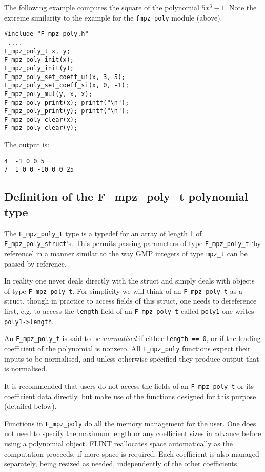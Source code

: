 \documentclass[a4paper,10pt]{article}
\newcommand{\code}{\lstinline}
\begin{document}
The following example computes the square of the polynomial $5x^3 - 1$. Note the extreme similarity to
the example for the \code{fmpz_poly} module (above).

\begin{lstlisting}
#include "F_mpz_poly.h"
 ....
F_mpz_poly_t x, y;
F_mpz_poly_init(x);
F_mpz_poly_init(y);
F_mpz_poly_set_coeff_ui(x, 3, 5);
F_mpz_poly_set_coeff_si(x, 0, -1);
F_mpz_poly_mul(y, x, x);
F_mpz_poly_print(x); printf("\n");
F_mpz_poly_print(y); printf("\n");
F_mpz_poly_clear(x);
F_mpz_poly_clear(y);
\end{lstlisting}

The output is:

\begin{lstlisting}
4  -1 0 0 5
7  1 0 0 -10 0 0 25
\end{lstlisting}

\subsection{Definition of the F\_mpz\_poly\_t polynomial type}

The \code{F_mpz_poly_t} type is a typedef for an array of length 1 of \code{F_mpz_poly_struct}'s. This 
permits passing parameters of type \code{F_mpz_poly_t} `by reference' in a manner similar to the way 
GMP integers of type \code{mpz_t} can be passed by reference. 

In reality one never deals directly with the struct and simply deals with objects of type 
\code{F_mpz_poly_t}. For simplicity we will think of an \code{F_mpz_poly_t} as a struct, though in
 practice to access fields of this struct, one needs to dereference first, e.g. to access the 
\code{length} field of an \code{F_mpz_poly_t} called \code{poly1} one writes \code{poly1->length}. 

An \code{F_mpz_poly_t} is said to be \emph{normalised} if either \code{length == 0}, or if the 
leading coefficient of the polynomial is nonzero. All \code{F_mpz_poly} functions expect their inputs 
to be normalised, and unless otherwise specified they produce output that is normalised. 

It is recommended that users do not access the fields of an \code{F_mpz_poly_t} or its coefficient 
data directly, but make use of the functions designed for this purpose (detailed below).

Functions in \code{F_mpz_poly} do all the memory management for the user. One does not need to specify 
the maximum length or any coefficient sizes in advance before using a polynomial object. FLINT 
reallocates space automatically as the computation proceeds, if more space is required. Each coefficient
is also managed separately, being resized as needed, independently of the other coefficients.
\end{document}

